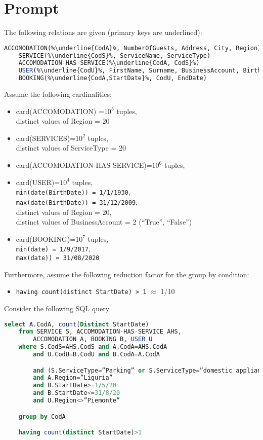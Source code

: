 \section{Prompt}

The following relations are given (primary keys are underlined):

\begin{lstlisting}[language = SQL, escapechar = \%]
    ACCOMODATION(%\underline{CodA}%, NumberOfGuests, Address, City, Region)
    SERVICE(%\underline{CodS}%, ServiceName, ServiceType)
    ACCOMODATION-HAS-SERVICE(%\underline{CodA, CodS}%)
    USER(%\underline{CodU}%, FirstName, Surname, BusinessAccount, BirthDate, Address, City, Region)
    BOOKING(%\underline{CodA,StartDate}%, CodU, EndDate)
\end{lstlisting}

Assume the following cardinalities:
\begin{ttfamily}
\begin{itemize}
    \item card(ACCOMODATION) =$10^5$ tuples, \\
    distinct values of Region = 20
    \item card(SERVICES)=$10^2$ tuples, \\
    distinct values of ServiceType = 20
    \item card(ACCOMODATION-HAS-SERVICE)=$10^6$ tuples,
    \item card(USER)=$10^4$ tuples,\\
    \lstinline{min(date(BirthDate)) = 1/1/1930},\\
    \lstinline{max(date(BirthDate)) = 31/12/2009},\\
    distinct values of Region = 20, \\
    distinct values of BusinessAccount = 2 (“True”, “False”)
    \item card(BOOKING)=$10^7$ tuples, \\
    \lstinline{min(date) = 1/9/2017},  \\
    \lstinline{max(date)) = 31/08/2020}
\end{itemize}
\end{ttfamily}
Furthermore, assume the following reduction factor for the group by condition:
\begin{itemize}
    \item \lstinline{having count(distinct StartDate) > 1} $≈$ 1/10
\end{itemize}

\pagebreak

Consider the following SQL query
\begin{lstlisting}[language=SQL]
    select A.CodA, count(Distinct StartDate)
    from SERVICE S, ACCOMODATION-HAS-SERVICE AHS,
        ACCOMODATION A, BOOKING B, USER U
    where S.CodS=AHS.CodS and A.CodA=AHS.CodA
        and U.CodU=B.CodU and B.CodA=A.CodA

        and (S.ServiceType=”Parking” or S.ServiceType=”domestic appliances”)
        and A.Region=”Liguria”
        and B.StartDate>=1/5/20
        and B.StartDate<=31/8/20
        and U.Region<>”Piemonte”

    group by CodA

    having count(distinct StartDate)>1
\end{lstlisting}
